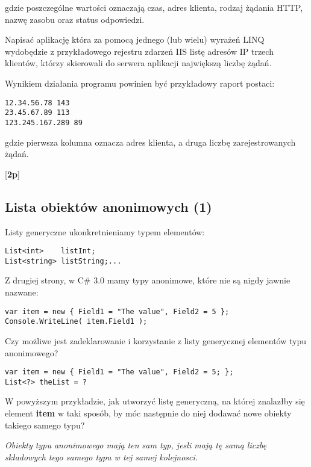 gdzie poszczególne wartości oznaczają czas, adres klienta, rodzaj żądania HTTP,
nazwę zasobu oraz status odpowiedzi.

  Napisać aplikację która za pomocą jednego (lub wielu) wyrażeń LINQ
  wydobędzie z przykładowego rejestru zdarzeń IIS listę adresów IP trzech
  klientów, którzy skierowali do serwera aplikacji największą liczbę żądań.
  
  Wynikiem działania programu powinien być przykładowy raport postaci:
  
\begin{verbatim}
12.34.56.78 143 
23.45.67.89 113 
123.245.167.289 89
\end{verbatim}
  
  gdzie pierwsza kolumna oznacza adres klienta, a druga liczbę zarejestrowanych żądań.
  
  [{\bf 2p}]

\subsection{Lista obiektów anonimowych (1)}

Listy generyczne ukonkretnieniamy typem elementów:
\label{lista_anonimowych}

\begin{verbatim}
List<int>    listInt;
List<string> listString;...
\end{verbatim}

Z drugiej strony, w C\# 3.0 mamy typy anonimowe, które nie są nigdy jawnie nazwane:

\begin{verbatim}
var item = new { Field1 = "The value", Field2 = 5 };
Console.WriteLine( item.Field1 );
\end{verbatim}

Czy możliwe jest zadeklarowanie i korzystanie z listy generycznej elementów typu anonimowego?

\begin{verbatim}
var item = new { Field1 = "The value", Field2 = 5; }; 
List<?> theList = ?    
\end{verbatim}

W powyższym przykładzie, jak utworzyć listę generyczną, na której znalazłby się element {\bf item}
w taki sposób, by móc następnie do niej dodawać nowe obiekty takiego samego typu?
	 
{\em Obiekty typu anonimowego mają ten sam typ, jesli mają tę samą liczbę składowych tego samego typu
w tej samej kolejnosci.}
	 
